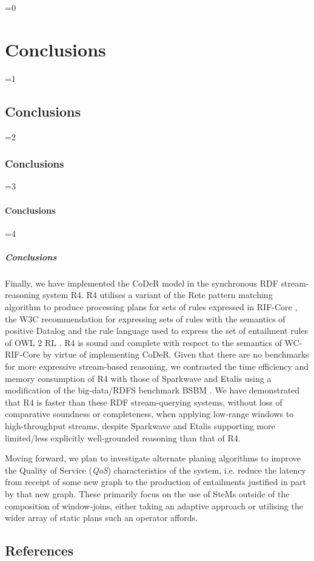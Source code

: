\documentclass[twocolumn,preprint,3p,number]{elsarticle}
\theoremstyle{plain}
\theoremstyle{definition}
\newcounter{nestingdepth}
\newenvironment{nestedsection}[2]{
  \ifnum\value{nestingdepth}=0
    \chapter{#1}
  \else
    \ifnum\value{nestingdepth}=1
      \section{#1}
    \else
      \ifnum\value{nestingdepth}=2
        \subsection{#1}
      \else
        \ifnum\value{nestingdepth}=3
          \subsubsection{#1}
        \else
          \ifnum\value{nestingdepth}=4
            \paragraph{#1}
          \else
            \PackageError{nestedsections}{Maximum nesting level exceeded!}{uh oh!}
          \fi
        \fi
      \fi
    \fi
  \fi
  \addtocounter{nestingdepth}{1}
  \label{sec:#2}
}{\addtocounter{nestingdepth}{-1}}
\begin{document}
\begin{nestedsection}{Conclusions}{conclusions}
  Finally, we have implemented the CoDeR model in the synchronous RDF stream-reasoning system R4.
  R4 utilises a variant of the Rete pattern matching algorithm \citep{forgy79} to produce processing plans for sets of rules expressed in RIF-Core \citep{w3crifcore}, the W3C recommendation for expressing sets of rules with the semantics of positive Datalog and the rule language used to express the set of entailment rules of OWL 2 RL \citep{w3cowl2profiles}.
  R4 is sound and complete with respect to the semantics of WC-RIF-Core by virtue of implementing CoDeR.
  Given that there are no benchmarks for more expressive stream-based reasoning, we contrasted the time efficiency and memory consumption of R4 with those of Sparkwave \citep{sparkwave} and Etalis \citep{EP-SPARQL} using a modification of the big-data/RDFS benchmark BSBM \citep{BSBMresults}.
  We have demonstrated that R4 is faster than these RDF stream-querying systems, without loss of comparative soundness or completeness, when applying low-range windows to high-throughput streams, despite Sparkwave and Etalis supporting more limited/less explicitly well-grounded reasoning than that of R4.

  Moving forward, we plan to investigate alternate planing algorithms to improve the Quality of Service (\emph{QoS}) characteristics of the system, i.e. reduce the latency from receipt of some new graph to the production of entailments justified in part by that new graph.
  These primarily focus on the use of SteMs outside of the composition of window-joins, either taking an adaptive approach \citep{eddies,CACQ,CQELS} or utilising the wider array of static plans such an operator affords.
\end{nestedsection}

  \section*{References}
	
	
\end{document}
